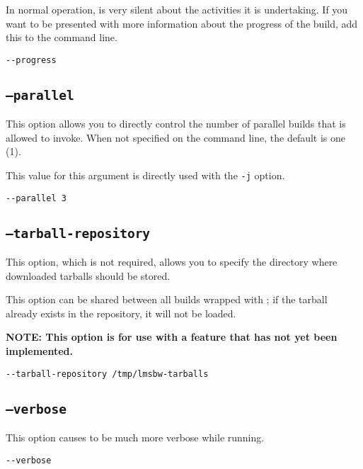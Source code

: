 In normal operation, \lmsbw is very silent about the activities it is
undertaking.  If you want to be presented with more information about
the progress of the build, add this to the command line.

\begin{verbatim}
--progress
\end{verbatim}

\subsection{\texttt{--parallel}}

This option allows you to directly control the number of parallel
builds that \make is allowed to invoke.  When not specified on the
command line, the default is one (1).

This value for this argument is directly used with the \gnumake
\texttt{-j} option.

\begin{verbatim}
--parallel 3
\end{verbatim}


\subsection{\texttt{--tarball-repository}}

This option, which is not required, allows you to specify the
directory where downloaded tarballs should be stored.

This option can be shared between all builds wrapped with \lmsbw; if
the tarball already exists in the repository, it will not be loaded.

\textbf{NOTE: This option is for use with a feature that has not yet
  been implemented.}

\begin{verbatim}
--tarball-repository /tmp/lmsbw-tarballs
\end{verbatim}

\subsection{\texttt{--verbose}}

This option causes \lmsbw to be much more verbose while running.

\begin{verbatim}
--verbose
\end{verbatim}

